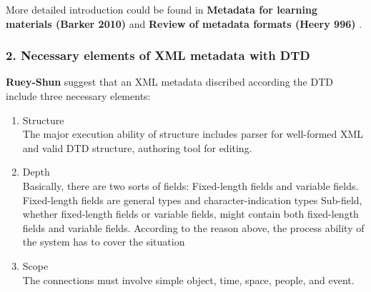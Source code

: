 More detailed introduction could be found in {\bf Metadata for learning materials (Barker 2010)} \cite{barker2010metadata} and {\bf Review of metadata formats (Heery 996)} \cite{heery1996review}.


\subsubsection*{2. Necessary elements of XML metadata with DTD}
\label{sec:mets}
{\bf Ruey-Shun}\cite{chen2003developing} suggest that an XML metadata discribed according the DTD include three necessary elements:
\begin{enumerate}
	\item Structure\\
	The major execution ability of structure includes parser for well-formed XML and
	valid DTD structure, authoring tool for editing.
	
	\item Depth\\
	Basically, there are two sorts of fields: Fixed-length fields and variable fields.
	Fixed-length fields are general types and character-indication types Sub-field, whether
	fixed-length fields or variable fields, might contain both fixed-length fields and
	variable fields. According to the reason above, the process ability of the system has to
	cover the situation
	
	\item Scope\\
	The connections must involve simple object, time, space, people, and event. 
\end{enumerate}


\clearpage %





